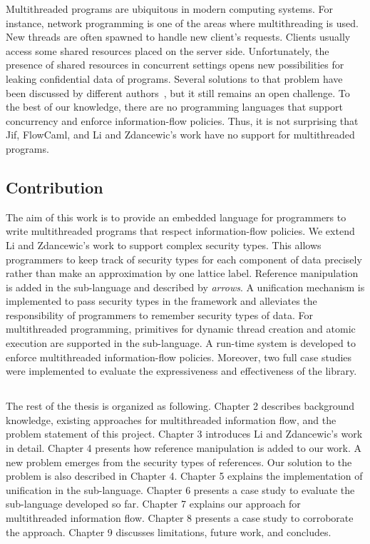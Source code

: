 \documentclass[a4paper]{report}
\begin{document}
Multithreaded programs are ubiquitous in modern computing systems. 
For instance, network programming 
is one of the areas where multithreading is used.
New threads are often spawned to handle new client's requests. 
Clients usually access some shared resources placed on the server side. 
Unfortunately, the presence of shared resources in concurrent settings 
opens new possibilities for leaking confidential data of programs.  
Several solutions to that problem have been discussed by different 
authors~\cite{Castellani:Boudol:TCS02,Russo:Sabelfeld:CSFW06,Sabelfeld:Sands:CSFW00,Volpano:Smith:Probabilistic}, 
but it still remains an open challenge. 
To the best of our knowledge, there are no programming languages that 
support concurrency and enforce information-flow policies. Thus, 
it is not surprising that Jif, FlowCaml,
and Li and Zdancewic's work have no support for multithreaded programs.

\subsection*{Contribution}
The aim of this work is to provide an embedded language for programmers
to write multithreaded programs that respect information-flow policies. 
We extend Li and Zdancewic's work to support complex security types. 
This allows programmers to keep track of security types for each component
of data precisely rather than make an approximation by one lattice label.
Reference manipulation is added in the sub-language and described by
{\em arrows}. A unification mechanism is implemented to pass
security types in the framework and alleviates the responsibility of programmers
to remember security types of data.
For multithreaded programming, primitives for dynamic thread 
creation and atomic execution are supported in the sub-language.
A run-time system is developed to enforce multithreaded information-flow policies.
Moreover, two full case studies were implemented to
evaluate the expressiveness and effectiveness of the library.

\subsection*{}
The rest of the thesis is organized as following. Chapter 2 describes background
knowledge, existing approaches for multithreaded
information flow, and the problem statement of this project.
Chapter 3 introduces Li and Zdancewic's work in detail. 
Chapter 4 presents how reference manipulation is added to our work. A new
problem emerges from the security types of references. Our solution to the
problem is also described in Chapter 4. Chapter 5 explains the 
implementation of unification in the sub-language. Chapter 6 presents a case study
to evaluate the sub-language developed so far. Chapter 7 explains
our approach for multithreaded information flow. Chapter 8 presents
a case study to corroborate the approach. Chapter 9 discusses limitations,
future work, and concludes.
\end{document}
